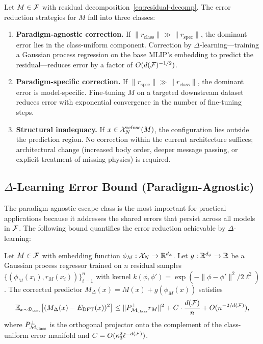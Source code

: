 \begin{corollary}\label{cor:escape}
Let $M \in \mathcal{F}$ with residual decomposition~\eqref{eq:residual-decomp}. The error reduction strategies for $M$ fall into three classes:
\begin{enumerate}[label=(\Alph*)]
    \item \textbf{Paradigm-agnostic correction.} If $\|r_{\text{class}}\| \gg \|r_{\text{spec}}\|$, the dominant error lies in the class-uniform component. Correction by $\Delta$-learning---training a Gaussian process regression on the base MLIP's embedding to predict the residual---reduces error by a factor of $O(d(\mathcal{F})^{-1/2})$.
    \item \textbf{Paradigm-specific correction.} If $\|r_{\text{spec}}\| \gg \|r_{\text{class}}\|$, the dominant error is model-specific. Fine-tuning $M$ on a targeted downstream dataset reduces error with exponential convergence in the number of fine-tuning steps.
    \item \textbf{Structural inadequacy.} If $x \in \mathcal{X}_N^{\text{refuse}}(M)$, the configuration lies outside the prediction region. No correction within the current architecture suffices; architectural change (increased body order, deeper message passing, or explicit treatment of missing physics) is required.
\end{enumerate}
\end{corollary}

\subsection{$\Delta$-Learning Error Bound (Paradigm-Agnostic)}

The paradigm-agnostic escape class is the most important for practical applications because it addresses the shared errors that persist across all models in $\mathcal{F}$. The following bound quantifies the error reduction achievable by $\Delta$-learning:

\begin{proposition}\label{prop:delta}
Let $M \in \mathcal{F}$ with embedding function $\phi_M: \mathcal{X}_N \to \mathbb{R}^{d_\phi}$. Let $g: \mathbb{R}^{d_\phi} \to \mathbb{R}$ be a Gaussian process regressor trained on $n$ residual samples $\{(\phi_M(x_i), r_M(x_i))\}_{i=1}^n$ with kernel $k(\phi, \phi') = \exp(-\|\phi - \phi'\|^2 / 2\ell^2)$. The corrected predictor $M_{\Delta}(x) = M(x) + g(\phi_M(x))$ satisfies
\begin{equation}\label{eq:delta-bound}
    \mathbb{E}_{x \sim \mathcal{D}_{\text{test}}}\bigl[(M_{\Delta}(x) - E_{\text{DFT}}(x))^2\bigr] \leq \|P_{\mathcal{M}_{\text{class}}}^\perp r_M\|^2 + C \cdot \frac{d(\mathcal{F})}{n} + O(n^{-2/d(\mathcal{F})}),
\end{equation}
where $P_{\mathcal{M}_{\text{class}}}^\perp$ is the orthogonal projector onto the complement of the class-uniform error manifold and $C = O(\kappa_3^2 \ell^{-d(\mathcal{F})})$.
\end{proposition}

